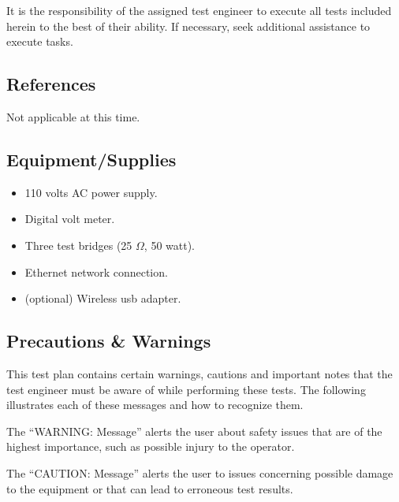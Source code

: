 \documentclass{article}
\begin{document}
It is the responsibility of the assigned test engineer to execute all tests
included herein to the best of their ability. If necessary, seek additional
assistance to execute tasks.

\subsection{References}

Not applicable at this time.


\subsection{Equipment/Supplies}

\begin{itemize}
\item 110 volts AC power supply.
\item Digital volt meter.
\item Three test bridges (25 $\Omega$, 50 watt).
\item Ethernet network connection.
\item (optional) Wireless usb adapter.
\end{itemize}

\subsection{Precautions \& Warnings}

This test plan contains certain warnings, cautions and important
notes that the test engineer must be aware of while performing these tests.
The following illustrates each of these messages and how to recognize them.


The ``WARNING: Message'' alerts the user about safety issues that are of
the highest importance, such as possible injury to the operator.


The ``CAUTION: Message'' alerts the user to issues concerning possible
damage to the equipment or that can lead to erroneous test results.

\end{document}
